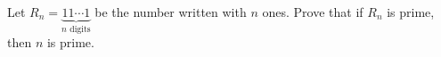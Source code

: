 Let $R_n=\underbrace{11\cdots1}_{n\text{ digits}}$ be the number written with $n$ ones. Prove that if $R_n$ is prime, then $n$ is prime.
